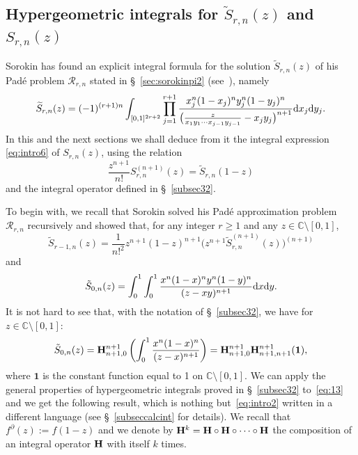 \documentclass[reqno,12pt]{amsart}
\numberwithin{equation}{section}
\theoremstyle{remark}
\def\dd{\textup{d}}
\newcommand{\C}{\mathbb{C}}
\newcommand{\BBB}{{\bf H}}
\newcommand{\soro}{\mathcal{R}_{r,n}}
\begin{document}
\subsection{Hypergeometric integrals for $\tilde{S}_{r,n}(z)$ and $S_{r,n}(z)$} \label{subsec54}

Sorokin has   found an explicit integral formula for the solution 
$\widetilde{S}_{r,n}(z)$ of his Pad\'e problem $\soro$ stated in \S~\ref{sec:sorokinpi2} 
(see~\cite[Lemma 17, p. 1835]{sorokin1}), namely
\begin{equation}\label{eq:intro2}
\widetilde{S}_{r,n}(z)=(-1)^{(r+1)n}\int_{[0,1]^{2r+2}} \prod_{j=1}^{r+1} \frac{x_j^n(1-x_j)^n y_j^n(1-y_j)^n}
{\big(\frac{z}{x_1y_1\cdots x_{j-1}y_{j-1}}-x_jy_j\big)^{n+1}} 
\dd x_j\dd y_j.
\end{equation}
In this and the next sections we shall deduce from it the  integral expression \eqref{eq:intro6}  
of $S_{r,n}(z)$, using the relation
\begin{equation}\label{eq:11}
\frac{z^{n+1}}{n!}S_{r,n}^{(n+1)}(z)= \widetilde{S}_{r,n}(1-z)
\end{equation}
and the integral operator defined in \S~\ref{subsec32}. 

\medskip

To begin with, we recall that 
Sorokin solved his Pad\'e approximation problem $\soro$ recursively 
and showed that, for any integer  $r\ge 1$ and 
any $z\in \mathbb C\setminus [0,1]$, 
\begin{equation}\label{eq:13}
\tilde{S}_{r-1,n}(z) = \frac{1}{n!^2}z^{n+1}(1-z)^{n+1}\big(z^{n+1}\tilde{S}_{r,n}^{(n+1)}(z)\big)^{(n+1)}
\end{equation}
and 
$$
\tilde{S}_{0,n}(z)=\int_0^1\int_0^1 \frac{x^n(1-x)^ny^n(1-y)^n}{(z-xy)^{n+1}} \dd x\dd y.
$$
It is not hard to see that, with the notation of \S~\ref{subsec32}, we have for $z\in\C\setminus[0,1]$:
\begin{equation}\label{eq59bis}
\tilde{S}_{0,n}(z) = \BBB^{n+1}_{n+1,0}  \left(\int_0^1 \frac{x^n(1-x)^n}{(z-x)^{n+1}}\right)=
\BBB^{n+1}_{n+1,0}  \BBB^{n+1}_{n+1,n+1}  (\boldsymbol{1}),
\end{equation}
where $\boldsymbol{1}$ is the constant function equal to 1 on $\C\setminus[0,1]$. 
We can apply the general properties of  hypergeometric integrals proved in  \S~\ref{subsec32} to~\eqref{eq:13} and we get 
the following result, which 
is nothing but~\eqref{eq:intro2} written in a different language (see \S~\ref{subseccalcint} 
for details). We recall that $f^{\partial}(z):=f(1-z)$ and we denote by $\BBB^k 
= \BBB\circ\BBB \circ\cdots\circ\BBB$ the composition of an integral 
operator $\BBB$ with itself $k$ times.
\end{document}
